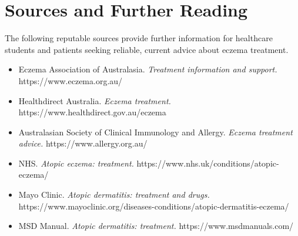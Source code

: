 \section*{Sources and Further Reading}
The following reputable sources provide further information for healthcare students and patients seeking reliable, current advice about eczema treatment.
\begin{itemize}
    \item Eczema Association of Australasia. \textit{Treatment information and support.} https://www.eczema.org.au/
    \item Healthdirect Australia. \textit{Eczema treatment.} https://www.healthdirect.gov.au/eczema
    \item Australasian Society of Clinical Immunology and Allergy. \textit{Eczema treatment advice.} https://www.allergy.org.au/
    \item NHS. \textit{Atopic eczema: treatment.} https://www.nhs.uk/conditions/atopic-eczema/
    \item Mayo Clinic. \textit{Atopic dermatitis: treatment and drugs.} https://www.mayoclinic.org/diseases-conditions/atopic-dermatitis-eczema/
    \item MSD Manual. \textit{Atopic dermatitis: treatment.} https://www.msdmanuals.com/
\end{itemize}

